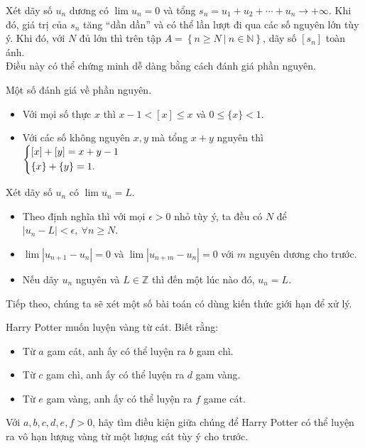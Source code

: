 \begin{bode}
	Xét dãy số $u_n$ dương có $\lim u_n=0$ và tổng $s_n=u_1+u_2+\cdots+u_n\to +\infty$. Khi đó, giá trị của $s_n$ tăng “dần dần” và có thể lần lượt đi qua các số nguyên lớn tùy ý. Khi đó, với $N$ đủ lớn thì trên tập $A=\left\{n\ge N\ \big|\ n\in\mathbb{N}\right\}$, dãy số $\left[s_n\right]$ toàn ánh.\\
	Điều này có thể chứng minh dễ dàng bằng cách đánh giá phần nguyên.
\end{bode}

\begin{bode}
	Một số đánh giá về phần nguyên.
	\begin{itemize}
		\item Với mọi số thực $x$ thì $x-1<[x]\le x$ và $0\le \{x\}<1$.
		\item Với các số không nguyên $x,y$ mà tổng $x+y$ nguyên thì $\left\{\begin{aligned}&[x]+[y]=x+y-1 \\ &\{x\}+\{y\}=1.\end{aligned}\right.$
	\end{itemize}
\end{bode}

\begin{bode}
	Xét dãy số $u_n$ có $\lim u_n=L$.
	\begin{itemize}
		\item Theo định nghĩa thì với mọi $\epsilon>0$ nhỏ tùy ý, ta đều có $N$ để $\left|u_n-L\right|<\epsilon,\ \forall n\ge N$.
		\item $\lim \left|u_{n+1}-u_n\right|=0$ và $\lim \left|u_{n+m}-u_n\right|=0$ với $m$ nguyên dương cho trước.
		\item Nếu dãy $u_n$ nguyên và $L\in \mathbb{Z}$ thì đến một lúc nào đó, $u_n=L$.
	\end{itemize}
\end{bode}
Tiếp theo, chúng ta sẽ xét một số bài toán có dùng kiến thức giới hạn để xử lý.
\begin{vd}
	Harry Potter muốn luyện vàng từ cát. Biết rằng:
	\begin{itemize}
		\item Từ $a$ gam cát, anh ấy có thể luyện ra $b$ gam chì.
		\item Từ $c$ gam chì, anh ấy có thể luyện ra $d$ gam vàng.
		\item Từ $e$ gam vàng, anh ấy có thể luyện ra $f$ game cát.
	\end{itemize}
	Với $a,b,c,d,e,f>0$, hãy tìm điều kiện giữa chúng để Harry Potter có thể luyện ra vô hạn lượng vàng từ một lượng cát tùy ý cho trước.
\end{vd}

